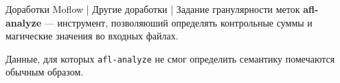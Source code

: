 \documentclass[10pt]{beamer}
\begin{document}


\begin{frame}{Доработки Moflow | Другие доработки | Задание гранулярности меток}
\textbf{afl-analyze} --- инструмент, позволяюший определять контрольные суммы и магические значения во входных файлах.
\begin{figure}[H]
\end{figure}
Данные, для которых \texttt{afl-analyze} не смог определить семантику помечаются обычным образом.
\end{frame}
\end{document}
